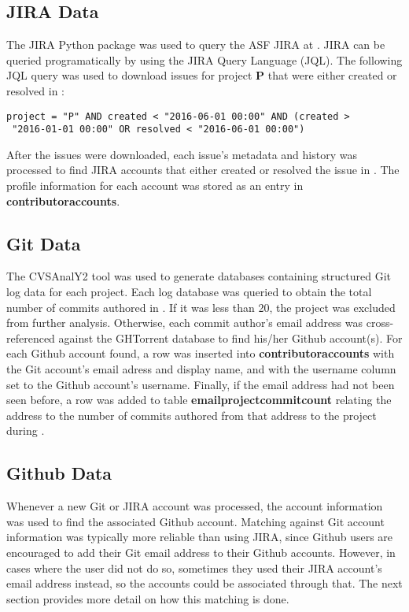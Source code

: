 \subsection{JIRA Data}\label{jirasec}
The JIRA Python package was used to query the ASF JIRA at \ASFJIRAURL. JIRA can be queried programatically by using the JIRA Query Language (JQL). The following JQL query was used to download issues for project \textbf{P} that were either created or resolved in \timeperiod{}:
\begin{lstlisting}
project = "P" AND created < "2016-06-01 00:00" AND (created >
 "2016-01-01 00:00" OR resolved < "2016-06-01 00:00")
\end{lstlisting}
After the issues were downloaded, each issue's metadata and history was processed to find JIRA accounts that either created or resolved the issue in \timeperiod{}. The profile information for each account was stored as an entry in \textbf{contributoraccounts}.
\subsection{Git Data}\label{gitsec}
The CVSAnalY2 tool was used to generate databases containing structured Git log data for each project. Each log database was queried to obtain the total number of commits authored in \timeperiod{}. If it was less than 20, the project was excluded from further analysis. Otherwise, each commit author's email address was cross-referenced against the GHTorrent database to find his/her Github account(s). For each Github account found, a row was inserted into \textbf{contributoraccounts} with the Git account's email adress and display name, and with the username column set to the Github account's username. Finally, if the email address had not been seen before, a row was added to table \textbf{emailprojectcommitcount} relating the address to the number of commits authored from that address to the project during \timeperiod{}.
\subsection{Github Data}\label{githubsec}
Whenever a new Git or JIRA account was processed, the account information was used to find the associated Github account. Matching against Git account information was typically more reliable than using JIRA, since Github users are encouraged to add their Git email address to their Github accounts. However, in cases where the user did not do so, sometimes they used their JIRA account's email address instead, so the accounts could be associated through that. The next section provides more detail on how this matching is done.

